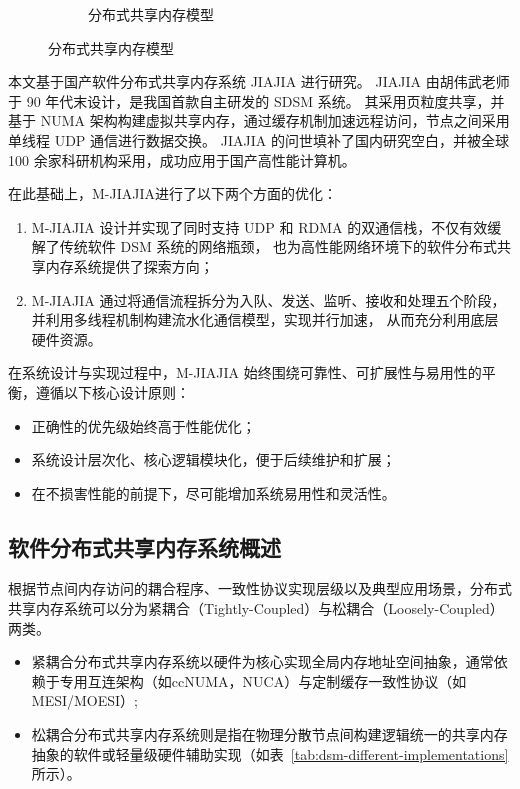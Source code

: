 {\begin{figure}[!htbp]
\begin{subfigure}[b]{0.6\textwidth}
      \caption{分布式共享内存模型}
      \label{fig:dsm}
    \end{subfigure}
    \label{fig:model}
  \end{figure}

  本文基于国产软件分布式共享内存系统 JIAJIA\citep{huweiwu2001sma,huweiwu2024ca,1999huweiwuJIAJIA} 进行研究。
  JIAJIA 由胡伟武老师于 90 年代末设计，是我国首款自主研发的 SDSM 系统。
  其采用页粒度共享，并基于 NUMA 架构构建虚拟共享内存，通过缓存机制加速远程访问，节点之间采用单线程 UDP 通信进行数据交换。
  JIAJIA 的问世填补了国内研究空白，并被全球 100 余家科研机构采用，成功应用于国产高性能计算机。

  在此基础上，M-JIAJIA进行了以下两个方面的优化：
  \begin{enumerate}
    \item M-JIAJIA 设计并实现了同时支持 UDP 和 RDMA 的双通信栈，不仅有效缓解了传统软件 DSM 系统的网络瓶颈，
          也为高性能网络环境下的软件分布式共享内存系统提供了探索方向；
    \item M-JIAJIA 通过将通信流程拆分为入队、发送、监听、接收和处理五个阶段，并利用多线程机制构建流水化通信模型，实现并行加速，
          从而充分利用底层硬件资源。
  \end{enumerate}

  在系统设计与实现过程中，M-JIAJIA 始终围绕可靠性、可扩展性与易用性的平衡，遵循以下核心设计原则：
  \begin{itemize}
    \item 正确性的优先级始终高于性能优化；
    \item 系统设计层次化、核心逻辑模块化，便于后续维护和扩展；
    \item 在不损害性能的前提下，尽可能增加系统易用性和灵活性。
  \end{itemize}

  \subsection{软件分布式共享内存系统概述}
  根据节点间内存访问的耦合程序、一致性协议实现层级以及典型应用场景，分布式共享内存系统可以分为紧耦合（Tightly-Coupled）与松耦合（Loosely-Coupled）两类。
  \begin{itemize}
    \item 紧耦合分布式共享内存系统以硬件为核心实现全局内存地址空间抽象，通常依赖于专用互连架构（如ccNUMA，NUCA）与定制缓存一致性协议（如MESI/MOESI）;
    \item 松耦合分布式共享内存系统则是指在物理分散节点间构建逻辑统一的共享内存抽象的软件或轻量级硬件辅助实现（如表~\ref{tab:dsm-different-implementations}所示）。
  \end{itemize}

}

